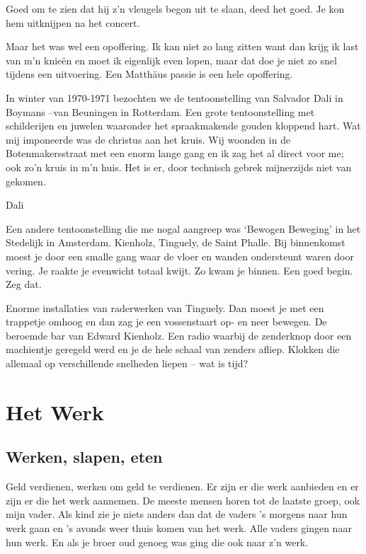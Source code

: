 \documentclass[10pt,twoside,openright]{memoir}
\begin{document}
Goed om te zien dat hij z’n vleugels begon uit te slaan, deed het goed. Je kon hem uitknijpen na het concert.  

Maar het was wel een opoffering. Ik kan niet zo lang zitten want dan krijg ik last van m’n knieën en moet ik eigenlijk even lopen, maar dat doe je niet zo snel tijdens een uitvoering. Een Matthäus passie is een hele opoffering.

In winter van 1970-1971 bezochten we de tentoonstelling van Salvador Dali in Boymans –van Beuningen in Rotterdam. Een grote tentoonstelling met schilderijen en juwelen waaronder het spraakmakende gouden kloppend hart. Wat mij imponeerde was de christus aan het kruis. Wij woonden in de Botenmakersstraat met een enorm lange gang en ik zag het al direct voor me; ook zo’n kruis in m’n huis. Het is er, door technisch gebrek mijnerzijds niet van gekomen.

Dali

Een andere tentoonstelling die me nogal aangreep was ‘Bewogen Beweging’ in het Stedelijk in Amsterdam. Kienholz, Tinguely, de Saint Phalle. Bij binnenkomst moest je door een smalle gang waar de vloer en wanden ondersteunt waren door vering. Je raakte je evenwicht totaal kwijt. Zo kwam je binnen. Een goed begin. Zeg dat.

Enorme installaties van raderwerken van Tinguely. Dan moest je met een trappetje omhoog en dan zag je een vossenstaart op- en neer bewegen. De beroemde bar van Edward Kienholz. Een radio waarbij de zenderknop door een machientje geregeld werd en je de hele schaal van zenders afliep. Klokken die allemaal op verschillende snelheden liepen – wat is tijd? 

\part{Het Werk}

\chapter{Werken, slapen, eten} %
\label{cha:werkenslapen}

Geld verdienen, werken om geld te verdienen. Er zijn er die werk aanbieden en er zijn er die het werk aannemen. De meeste mensen horen tot de laatste groep, ook mijn vader. Als kind zie je niets anders dan dat de vaders ’s morgens naar hun werk gaan en ’s avonds weer thuis komen van het werk. Alle vaders gingen naar hun werk. En als je broer oud genoeg was ging die ook naar z’n werk.
\end{document}
